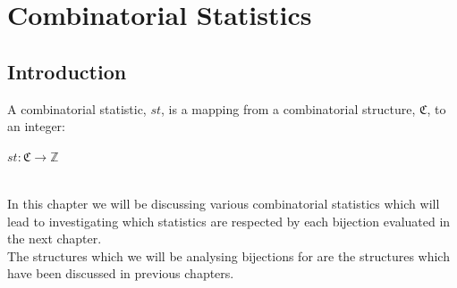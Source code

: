 \documentclass[12pt]{article}
\begin{document}
\section{Combinatorial Statistics}
\subsection{Introduction}
A combinatorial statistic, $st$, is a mapping from a combinatorial structure, $\mathfrak{C}$, to an integer:\\
\centerline{$st: \mathfrak{C} \rightarrow \mathbb{Z}$}\\
In this chapter we will be discussing various combinatorial statistics which will lead to investigating which statistics are respected by each bijection evaluated in the next chapter.\\
The structures which we will be analysing bijections for are the structures which have been discussed in previous chapters.
\end{document}
